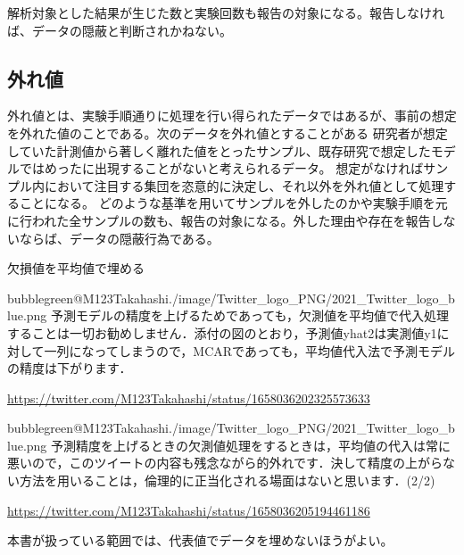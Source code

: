 解析対象とした結果が生じた数と実験回数も報告の対象になる。報告しなければ、データの隠蔽と判断されかねない。


\subsection{外れ値}
外れ値とは、実験手順通りに処理を行い得られたデータではあるが、事前の想定を外れた値のことである。次のデータを外れ値とすることがある
研究者が想定していた計測値から著しく離れた値をとったサンプル、既存研究で想定したモデルではめったに出現することがないと考えられるデータ。
想定がなければサンプル内において注目する集団を恣意的に決定し、それ以外を外れ値として処理することになる。
どのような基準を用いてサンプルを外したのかや実験手順を元に行われた全サンプルの数も、報告の対象になる。外した理由や存在を報告しないならば、データの隠蔽行為である。

\begin{SMbox}{欠損値を平均値で埋める}
 \begin{rightbubbles}{bubblegreen}{@M123Takahashi}{./image/Twitter_logo_PNG/2021_Twitter_logo_blue.png}
  予測モデルの精度を上げるためであっても，欠測値を平均値で代入処理することは一切お勧めしません．添付の図のとおり，予測値yhat2は実測値y1に対して一列になってしまうので，MCARであっても，平均値代入法で予測モデルの精度は下がります．
  \begin{flushright}
   \small	\url{https://twitter.com/M123Takahashi/status/1658036202325573633}
  \end{flushright}
 \end{rightbubbles}

\begin{rightbubbles}{bubblegreen}{@M123Takahashi}{./image/Twitter_logo_PNG/2021_Twitter_logo_blue.png}
  予測精度を上げるときの欠測値処理をするときは，平均値の代入は常に悪いので，このツイートの内容も残念ながら的外れです．決して精度の上がらない方法を用いることは，倫理的に正当化される場面はないと思います．(2/2)
  \begin{flushright}
   \small	\url{https://twitter.com/M123Takahashi/status/1658036205194461186}
  \end{flushright}
 \end{rightbubbles}
 本書が扱っている範囲では、代表値でデータを埋めないほうがよい。
\end{SMbox}


